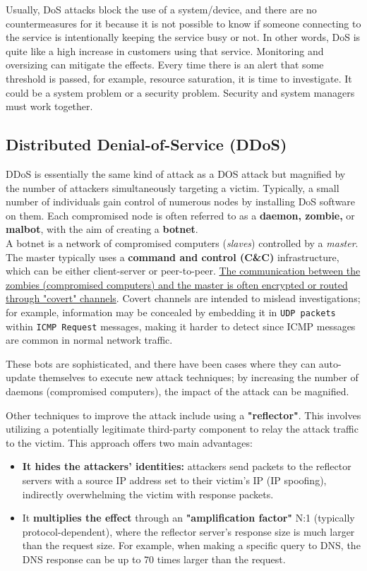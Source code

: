 Usually, DoS attacks block the use of a system/device, and there are no countermeasures for it because it is not possible to know if someone connecting to the service is intentionally keeping the service busy or not. In other words, DoS is quite like a high increase in customers using that service. Monitoring and oversizing can mitigate the effects. Every time there is an alert that some threshold is passed, for example, resource saturation, it is time to investigate. It could be a system problem or a security problem. Security and system managers must work together.



\subsection{Distributed Denial-of-Service (DDoS)}

DDoS is essentially the same kind of attack as a DOS attack but magnified by the number of attackers simultaneously targeting a victim.
Typically, a small number of individuals gain control of numerous nodes by installing DoS software on them. Each compromised node is often referred to as a \textbf{daemon, zombie,} or \textbf{malbot}, with the aim of creating a \textbf{botnet}.\\
A botnet is a network of compromised computers (\emph{slaves}) controlled by a \emph{master}. The master typically uses a \textbf{command and control (C\&C)} infrastructure, which can be either client-server or peer-to-peer.
\ul{The communication between the zombies (compromised computers) and the master is often encrypted or routed through "covert" channels}. Covert channels are intended to mislead investigations; for example, information may be concealed by embedding it in \texttt{UDP packets} within \texttt{ICMP Request} messages, making it harder to detect since ICMP messages are common in normal network traffic.

These bots are sophisticated, and there have been cases where they can auto-update themselves to execute new attack techniques; by increasing the number of daemons (compromised computers), the impact of the attack can be magnified.

Other techniques to improve the attack include using a \textbf{"reflector"}. This involves utilizing a potentially legitimate third-party component to relay the attack traffic to the victim. This approach offers two main advantages:
\begin{itemize}
  \item \textbf{It hides the attackers' identities:} attackers send packets to the reflector servers with a source IP address set to their victim's IP (IP spoofing), indirectly overwhelming the victim with response packets.
  \item It \textbf{multiplies the effect} through an \textbf{"amplification factor"} N:1 (typically protocol-dependent),
        where the reflector server's response size is much larger than the request size.
        For example, when making a specific query to DNS, the DNS response can be up to 70 times larger than the request.
\end{itemize}



